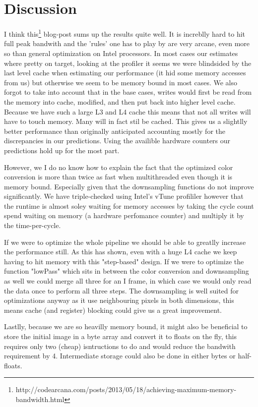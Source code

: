 \documentclass{article}
\begin{document}
\section{Discussion}
I think this\footnote{http://codearcana.com/posts/2013/05/18/achieving-maximum-memory-bandwidth.html} blog-post sums up the results quite well. It is increblly hard to hit full peak bandwith and the 'rules' one has to play by are very arcane, even more so than general optimization on Intel processors.
In most cases our estimates where pretty on target, looking at the profiler it seems we were blindsided by the last level cache when estimating our performance (it hid some memory accesses from us) but otherwise we seem to be memory bound in most cases.
 We also forgot to take into account that in the base cases, writes would first be read from the memory into cache, modified, and then put back into higher level cache. Because we have such a large L3 and L4 cache this means that not all writes will have to touch memory. Many will in fact stil be cached.
 This gives us a slightlly better performance than originally anticipated accounting mostly for the discrepancies in our predictions. Using the availible hardware counters our predictions hold up for the most part.
 \par However, we I do no know how to explain the fact that the optimized color conversion is more than twice as fast when multithreaded even though it is memory bound. Especially given that the downsampling functions do not improve significantly.
 We have triple-checked using Intel's vTune profililer however that the runtime is almost soley waiting for memory accesses by taking the cycle count spend waiting on memory (a hardware perfomance counter) and multiply it by the time-per-cycle.
\par If we were to optimize the whole pipeline we should be able to greatlly increase the performance still. As this has shown, even with a huge L4 cache we keep having to hit memory with this "step-based" design.
If we were to optimize the function "lowPass" which sits in between the color conversion and downsampling as well we could merge all three for an I frame, in which case we would only read the data once to perform all three steps. The downsampling is well suited for optimizations anyway as it use neighbouring pixels in both dimensions, this means
cache (and register) blocking could give us a great improvement.
\par Lastlly, because we are so heavilly memory bound, it might also be beneficial to store the initial image in a byte array and convert it to floats on the fly, this requires only two (cheap) isntructions to do and would reduce the bandwith requirement by 4. Intermediate storage could also be done in either bytes or half-floats.
\end{document}
